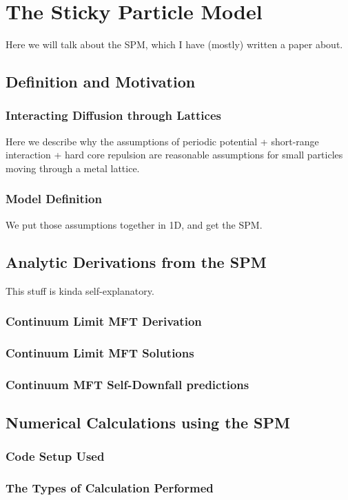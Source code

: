 \chapter{The Sticky Particle Model}
Here we will talk about the SPM, which I have (mostly) written a paper about.


\section{Definition and Motivation}

\subsection{Interacting Diffusion through Lattices}
Here we describe why the assumptions of periodic potential + short-range interaction + hard core repulsion are reasonable assumptions for small particles moving through a metal lattice.
\subsection{Model Definition}
We put those assumptions together in 1D, and get the SPM.

\section{Analytic Derivations from the SPM}
This stuff is kinda self-explanatory.
\subsection{Continuum Limit MFT Derivation}
\subsection{Continuum Limit MFT Solutions}
\subsection{Continuum MFT Self-Downfall predictions}

\section{Numerical Calculations using the SPM}
\subsection{Code Setup Used}
\subsection{The Types of Calculation Performed}
